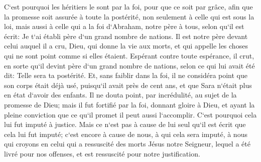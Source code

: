 \verse C`est pourquoi les héritiers le sont par la foi, pour que ce soit par grâce, afin que la promesse soit assurée à toute la postérité, non seulement à celle qui est sous la loi, mais aussi à celle qui a la foi d`Abraham, notre père à tous, selon qu`il est écrit: 
\verse Je t`ai établi père d`un grand nombre de nations. Il est notre père devant celui auquel il a cru, Dieu, qui donne la vie aux morts, et qui appelle les choses qui ne sont point comme si elles étaient. 
\verse Espérant contre toute espérance, il crut, en sorte qu`il devint père d`un grand nombre de nations, selon ce qui lui avait été dit: Telle sera ta postérité. 
\verse Et, sans faiblir dans la foi, il ne considéra point que son corps était déjà usé, puisqu`il avait près de cent ans, et que Sara n`était plus en état d`avoir des enfants. 
\verse Il ne douta point, par incrédulité, au sujet de la promesse de Dieu; mais il fut fortifié par la foi, donnant gloire à Dieu, 
\verse et ayant la pleine conviction que ce qu`il promet il peut aussi l`accomplir. 
\verse C`est pourquoi cela lui fut imputé à justice. 
\verse Mais ce n`est pas à cause de lui seul qu`il est écrit que cela lui fut imputé; 
\verse c`est encore à cause de nous, à qui cela sera imputé, à nous qui croyons en celui qui a ressuscité des morts Jésus notre Seigneur, 
\verse lequel a été livré pour nos offenses, et est ressuscité pour notre justification. 


